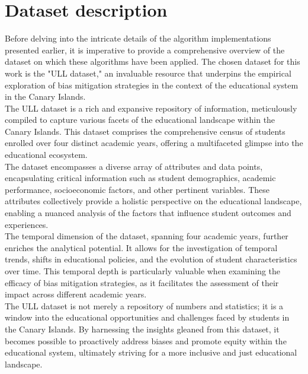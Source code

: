 \documentclass[12pt,a4paper,openright,twoside]{book}
\begin{document}
\section{Dataset description}
Before delving into the intricate details of the algorithm implementations presented earlier, it is imperative to provide a comprehensive overview of the dataset on which these algorithms have been applied. The chosen dataset for this work is the "ULL dataset," an invaluable resource that underpins the empirical exploration of bias mitigation strategies in the context of the educational system in the Canary Islands. \\
The ULL dataset is a rich and expansive repository of information, meticulously compiled to capture various facets of the educational landscape within the Canary Islands. This dataset comprises the comprehensive census of students enrolled over four distinct academic years, offering a multifaceted glimpse into the educational ecosystem. \\
The dataset encompasses a diverse array of attributes and data points, encapsulating critical information such as student demographics, academic performance, socioeconomic factors, and other pertinent variables. These attributes collectively provide a holistic perspective on the educational landscape, enabling a nuanced analysis of the factors that influence student outcomes and experiences. \\
The temporal dimension of the dataset, spanning four academic years, further enriches the analytical potential. It allows for the investigation of temporal trends, shifts in educational policies, and the evolution of student characteristics over time. This temporal depth is particularly valuable when examining the efficacy of bias mitigation strategies, as it facilitates the assessment of their impact across different academic years. \\
The ULL dataset is not merely a repository of numbers and statistics; it is a window into the educational opportunities and challenges faced by students in the Canary Islands. By harnessing the insights gleaned from this dataset, it becomes possible to proactively address biases and promote equity within the educational system, ultimately striving for a more inclusive and just educational landscape.
\end{document}

